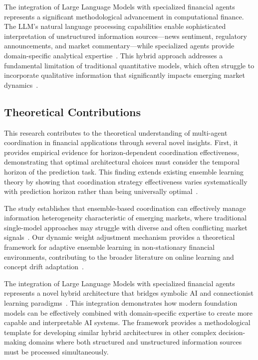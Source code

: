 \documentclass{ieeeaccess}
\begin{document}
The integration of Large Language Models with specialized financial agents represents a significant methodological advancement in computational finance. The LLM's natural language processing capabilities enable sophisticated interpretation of unstructured information sources—news sentiment, regulatory announcements, and market commentary—while specialized agents provide domain-specific analytical expertise~\cite{kenton2019bert}. This hybrid approach addresses a fundamental limitation of traditional quantitative models, which often struggle to incorporate qualitative information that significantly impacts emerging market dynamics~\cite{tetlock2007giving}.


\subsection{Theoretical Contributions}
This research contributes to the theoretical understanding of multi-agent coordination in financial applications through several novel insights. First, it provides empirical evidence for horizon-dependent coordination effectiveness, demonstrating that optimal architectural choices must consider the temporal horizon of the prediction task. This finding extends existing ensemble learning theory by showing that coordination strategy effectiveness varies systematically with prediction horizon rather than being universally optimal~\cite{hansen2001neural}.

The study establishes that ensemble-based coordination can effectively manage information heterogeneity characteristic of emerging markets, where traditional single-model approaches may struggle with diverse and often conflicting market signals~\cite{harvey1995predictable}. Our dynamic weight adjustment mechanism provides a theoretical framework for adaptive ensemble learning in non-stationary financial environments, contributing to the broader literature on online learning and concept drift adaptation~\cite{gama2014survey}.

The integration of Large Language Models with specialized financial agents represents a novel hybrid architecture that bridges symbolic AI and connectionist learning paradigms~\cite{bommasani2021foundation,brown2020language}. This integration demonstrates how modern foundation models can be effectively combined with domain-specific expertise to create more capable and interpretable AI systems. The framework provides a methodological template for developing similar hybrid architectures in other complex decision-making domains where both structured and unstructured information sources must be processed simultaneously.
\end{document}
